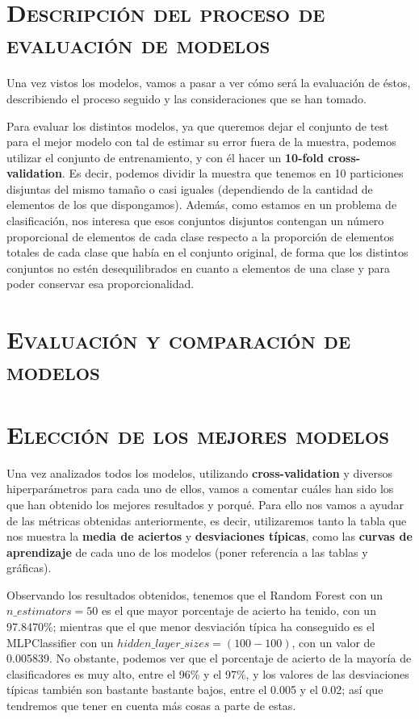 \documentclass[11pt,a4paper]{article}
\begin{document}
\section{\textsc{Descripción del proceso de evaluación de modelos}}

Una vez vistos los modelos, vamos a pasar a ver cómo será la evaluación de éstos, describiendo el proceso seguido y las consideraciones que
se han tomado.

Para evaluar los distintos modelos, ya que queremos dejar el conjunto de test para el mejor modelo con tal de estimar su error fuera de la
muestra, podemos utilizar el conjunto de entrenamiento, y con él hacer un \textbf{10-fold cross-validation}. Es decir, podemos dividir
la muestra que tenemos en 10 particiones disjuntas del mismo tamaño o casi iguales (dependiendo de la cantidad de elementos de los que
dispongamos). Además, como estamos en un problema de clasificación, nos interesa que esos conjuntos disjuntos contengan un número proporcional
de elementos de cada clase respecto a la proporción de elementos totales de cada clase que había en el conjunto original, de forma que
los distintos conjuntos no estén desequilibrados en cuanto a elementos de una clase y para poder conservar esa proporcionalidad.

\section{\textsc{Evaluación y comparación de modelos}}

\newpage

\section{\textsc{Elección de los mejores modelos}}

Una vez analizados todos los modelos, utilizando \textbf{cross-validation} y diversos hiperparámetros para cada uno de ellos, vamos a
comentar cuáles han sido los que han obtenido los mejores resultados y porqué. Para ello nos vamos a ayudar de las métricas obtenidas
anteriormente, es decir, utilizaremos tanto la tabla que nos muestra la \textbf{media de aciertos} y \textbf{desviaciones típicas}, como
las \textbf{curvas de aprendizaje} de cada uno de los modelos (poner referencia a las tablas y gráficas).

Observando los resultados obtenidos, tenemos que el Random Forest con un $n\_estimators = 50$ es el que mayor porcentaje de acierto ha
tenido, con un 97.8470\%; mientras que el que menor desviación típica ha conseguido es el MLPClassifier con un $hidden\_layer\_sizes =
(100-100)$, con un valor de 0.005839. No obstante, podemos ver que el porcentaje de acierto de la mayoría de clasificadores es muy alto,
entre el 96\% y el 97\%, y los valores de las desviaciones típicas también son bastante bastante bajos, entre el 0.005 y el 0.02; así que
tendremos que tener en cuenta más cosas a parte de estas.
\end{document}

